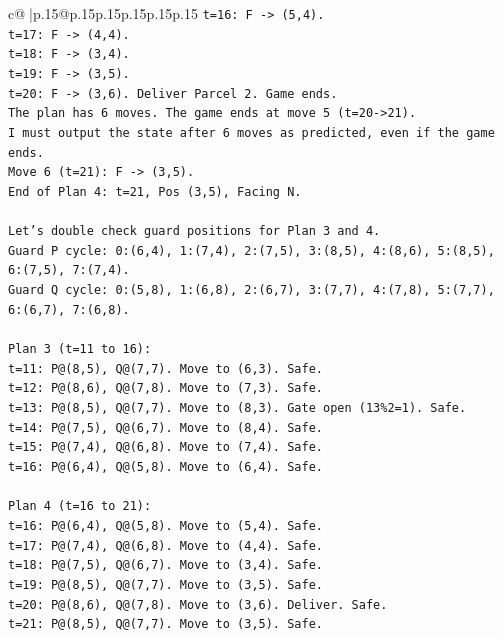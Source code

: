 \documentclass{article}
\begin{document}
{\begin{supertabular}{c@{$\;$}|p{.15\linewidth}@{}p{.15\linewidth}p{.15\linewidth}p{.15\linewidth}p{.15\linewidth}p{.15\linewidth}}
{{{\texttt{t=16: F {-}> (5,4).} \\
\texttt{t=17: F {-}> (4,4).} \\
\texttt{t=18: F {-}> (3,4).} \\
\texttt{t=19: F {-}> (3,5).} \\
\texttt{t=20: F {-}> (3,6). Deliver Parcel 2. Game ends.} \\
\texttt{The plan has 6 moves. The game ends at move 5 (t=20{-}>21).} \\
\texttt{I must output the state after 6 moves as predicted, even if the game ends.} \\
\texttt{Move 6 (t=21): F {-}> (3,5).} \\
\texttt{End of Plan 4: t=21, Pos (3,5), Facing N.} \\
\\ 
\texttt{Let's double check guard positions for Plan 3 and 4.} \\
\texttt{Guard P cycle: 0:(6,4), 1:(7,4), 2:(7,5), 3:(8,5), 4:(8,6), 5:(8,5), 6:(7,5), 7:(7,4).} \\
\texttt{Guard Q cycle: 0:(5,8), 1:(6,8), 2:(6,7), 3:(7,7), 4:(7,8), 5:(7,7), 6:(6,7), 7:(6,8).} \\
\\ 
\texttt{Plan 3 (t=11 to 16):} \\
\texttt{t=11: P@(8,5), Q@(7,7). Move to (6,3). Safe.} \\
\texttt{t=12: P@(8,6), Q@(7,8). Move to (7,3). Safe.} \\
\texttt{t=13: P@(8,5), Q@(7,7). Move to (8,3). Gate open (13\%2=1). Safe.} \\
\texttt{t=14: P@(7,5), Q@(6,7). Move to (8,4). Safe.} \\
\texttt{t=15: P@(7,4), Q@(6,8). Move to (7,4). Safe.} \\
\texttt{t=16: P@(6,4), Q@(5,8). Move to (6,4). Safe.} \\
\\ 
\texttt{Plan 4 (t=16 to 21):} \\
\texttt{t=16: P@(6,4), Q@(5,8). Move to (5,4). Safe.} \\
\texttt{t=17: P@(7,4), Q@(6,8). Move to (4,4). Safe.} \\
\texttt{t=18: P@(7,5), Q@(6,7). Move to (3,4). Safe.} \\
\texttt{t=19: P@(8,5), Q@(7,7). Move to (3,5). Safe.} \\
\texttt{t=20: P@(8,6), Q@(7,8). Move to (3,6). Deliver. Safe.} \\
\texttt{t=21: P@(8,5), Q@(7,7). Move to (3,5). Safe.} \\
}}}
\end{supertabular}}
\end{document}
